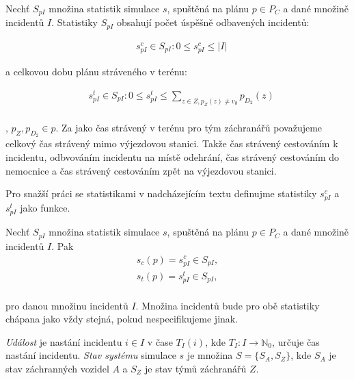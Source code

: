 \begin{definice}\label{df:statsSimul}
  Nechť $S_{pI}$ množina statistik simulace $s$, spuštěná na plánu $p \in P_C$ a dané množině incidentů $I$.
  Statistiky $S_{pI}$ obsahují počet úspěšně odbavených incidentů:

  \begin{align*}
    &s^{c}_{pI} \in S_{pI} \colon 0 \leq s^{c}_{pI} \leq |I|
  \end{align*}

  a celkovou dobu plánu stráveného v terénu:

  \begin{align*}
    &s^{t}_{pI} \in S_{pI} \colon 0 \leq s^{t}_{pI} \leq \sum_{z \in Z, p_Z(z) \neq v_{\emptyset}}{p_{D_2}(z)}
  \end{align*}
  \\ 
  , $p_Z, p_{D_2} \in p$. Za jako čas strávený v terénu pro tým záchranářů považujeme celkový čas strávený mimo výjezdovou stanici.
  Takže čas strávený cestováním k incidentu, odbvováním incidentu na místě odehrání, čas strávený cestováním do nemocnice a čas strávený cestováním zpět na výjezdovou stanici.
  \\
\end{definice}

Pro snažší práci se statistikami v nadcházejícím textu definujme statistiky $s^c_{pI}$ a $s^t_{pI}$ jako funkce. 

\begin{definice}
  Nechť $S_{pI}$ množina statistik simulace $s$, spuštěná na plánu $p \in P_C$ a dané množině incidentů $I$.
  Pak
  \begin{align*}
    s_c(p) = s^c_{pI} \in S_{pI}, \\
    s_t(p) = s^t_{pI} \in S_{pI},
  \end{align*}
  \\
  pro danou množinu incidentů $I$. Množina incidentů bude pro obě statistiky chápana jako vždy stejná, pokud nespecifikujeme jinak.
\end{definice}

\textit{Událost} je nastání incidentu $i \in I$ v čase $T_I(i)$, kde $T_I \colon I \rightarrow \mathbb{N}_0$, určuje čas nastání incidentu.
\textit{Stav systému} simulace $s$ je množina $S = \{ S_A, S_Z \}$, kde $S_A$ je stav záchranných vozidel $A$ a $S_Z$ je stav týmů záchranářů $Z$. 

\clearpage 

